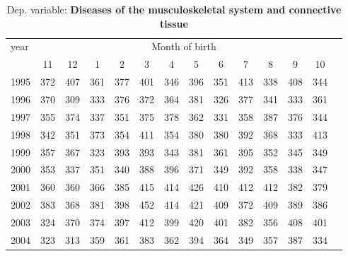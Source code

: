  \begin{table}[H] \begin{threeparttable} \centering \caption{Dep. variable: \textbf{Diseases of the musculoskeletal system and connective tissue}} {\def\sym#1{\ifmmode^{#1}\else\(^{#1}\)\fi} \begin{tabular}{l*{13}{c}} \toprule year & \multicolumn{12}{c}{Month of birth} \\ \cmidrule(lr){2-13} 
            &          11&          12&           1&           2&           3&           4&           5&           6&           7&           8&           9&          10\\
1995        &         372&         407&         361&         377&         401&         346&         396&         351&         413&         338&         408&         344\\
1996        &         370&         309&         333&         376&         372&         364&         381&         326&         377&         341&         333&         361\\
1997        &         355&         374&         337&         351&         375&         378&         362&         331&         358&         387&         376&         344\\
1998        &         342&         351&         373&         354&         411&         354&         380&         380&         392&         368&         333&         413\\
1999        &         357&         367&         323&         393&         393&         343&         381&         361&         395&         352&         345&         349\\
2000        &         353&         337&         351&         340&         388&         396&         371&         349&         392&         358&         338&         347\\
2001        &         360&         360&         366&         385&         415&         414&         426&         410&         412&         412&         382&         379\\
2002        &         383&         368&         381&         398&         452&         414&         421&         409&         372&         409&         389&         386\\
2003        &         324&         370&         374&         397&         412&         399&         420&         401&         382&         356&         408&         401\\
2004        &         323&         313&         359&         361&         383&         362&         394&         364&         349&         357&         387&         334\\

\end{tabular}}
\end{threeparttable}
\end{table}
